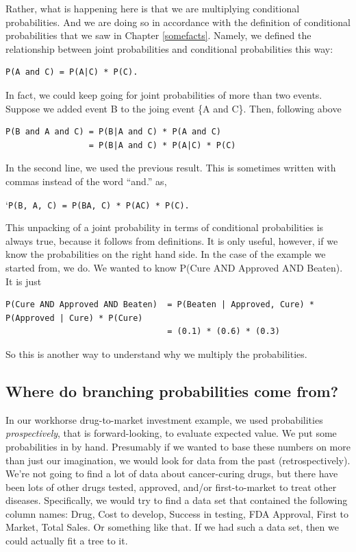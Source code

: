 \documentclass[openany]{book}
\begin{document}
Rather, what is happening here is that we are multiplying conditional probabilities. And we are doing so in accordance with the definition of conditional probabilities that we saw in Chapter \ref{somefacts}. Namely, we defined the relationship between joint probabilities and conditional probabilities this way:

\begin{verbatim}
P(A and C) = P(A|C) * P(C).
\end{verbatim}

In fact, we could keep going for joint probabilities of more than two events. Suppose we added event B to the joing event \{A and C\}. Then, following above

\begin{verbatim}
P(B and A and C) = P(B|A and C) * P(A and C)
                 = P(B|A and C) * P(A|C) * P(C)
\end{verbatim}

In the second line, we used the previous result. This is sometimes written with commas instead of the word ``and.'' as,

`\texttt{P(B,\ A,\ C)\ =\ P(B\textbar{}A,\ C)\ *\ P(A\textbar{}C)\ *\ P(C).}

This unpacking of a joint probability in terms of conditional probabilities is always true, because it follows from definitions. It is only useful, however, if we know the probabilities on the right hand side. In the case of the example we started from, we do. We wanted to know P(Cure AND Approved AND Beaten). It is just

\begin{verbatim}
P(Cure AND Approved AND Beaten)  = P(Beaten | Approved, Cure) * P(Approved | Cure) * P(Cure)
                                 = (0.1) * (0.6) * (0.3)
\end{verbatim}

So this is another way to understand why we multiply the probabilities.

\hypertarget{where-do-branching-probabilities-come-from}{%
\subsection*{Where do branching probabilities come from?}\label{where-do-branching-probabilities-come-from}}

In our workhorse drug-to-market investment example, we used probabilities \emph{prospectively}, that is forward-looking, to evaluate expected value. We put some probabilities in by hand. Presumably if we wanted to base these numbers on more than just our imagination, we would look for data from the past (retrospectively). We're not going to find a lot of data about cancer-curing drugs, but there have been lots of other drugs tested, approved, and/or first-to-market to treat other diseases. Specifically, we would try to find a data set that contained the following column names: Drug, Cost to develop, Success in testing, FDA Approval, First to Market, Total Sales. Or something like that. If we had such a data set, then we could actually fit a tree to it.
\end{document}
